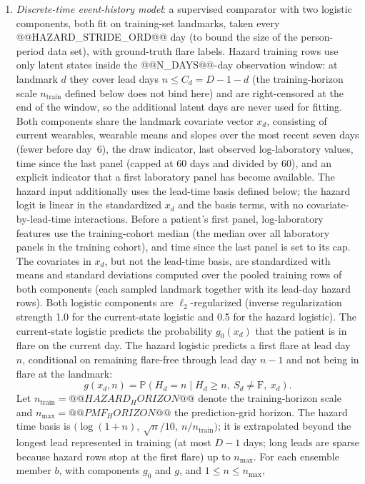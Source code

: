 \documentclass{ieeeaccess}
\newcommand{\F}{\mathrm{F}}
\newcommand{\Prb}{\mathbb P}
\begin{document}
\begin{enumerate}
\item \emph{Discrete-time event-history model}: a supervised comparator with two logistic components, both fit on training-set landmarks, taken every @@HAZARD_STRIDE_ORD@@ day (to bound the size of the person-period data set), with ground-truth flare labels. Hazard training rows use only latent states inside the @@N_DAYS@@-day observation window: at landmark $d$ they cover lead days $n\le C_d=D-1-d$ (the training-horizon scale $n_{\mathrm{train}}$ defined below does not bind here) and are right-censored at the end of the window, so the additional latent days are never used for fitting. Both components share the landmark covariate vector $x_d$, consisting of current wearables, wearable means and slopes over the most recent seven days (fewer before day~6), the draw indicator, last observed log-laboratory values, time since the last panel (capped at 60 days and divided by 60), and an explicit indicator that a first laboratory panel has become available. The hazard input additionally uses the lead-time basis defined below; the hazard logit is linear in the standardized $x_d$ and the basis terms, with no covariate-by-lead-time interactions. Before a patient's first panel, log-laboratory features use the training-cohort median (the median over all laboratory panels in the training cohort), and time since the last panel is set to its cap. The covariates in $x_d$, but not the lead-time basis, are standardized with means and standard deviations computed over the pooled training rows of both components (each sampled landmark together with its lead-day hazard rows). Both logistic components are $\ell_2$-regularized (inverse regularization strength 1.0 for the current-state logistic and 0.5 for the hazard logistic). The current-state logistic predicts the probability $g_0(x_d)$ that the patient is in flare on the current day. The hazard logistic predicts a first flare at lead day $n$, conditional on remaining flare-free through lead day $n-1$ and not being in flare at the landmark:
\[
g(x_d, n) = \Prb(H_d = n \mid H_d \ge n,\ S_d \neq \F,\ x_d).
\]
Let $n_{\mathrm{train}} = @@HAZARD_HORIZON@@$ denote the training-horizon scale and $n_{\max} = @@PMF_HORIZON@@$ the prediction-grid horizon. The hazard time basis is $\bigl(\log(1+n),\ \sqrt{n}/10,\ n/n_{\mathrm{train}}\bigr)$; it is extrapolated beyond the longest lead represented in training (at most $D-1$ days; long leads are sparse because hazard rows stop at the first flare) up to $n_{\max}$. For each ensemble member $b$, with components $g_0$ and $g$, and $1 \le n \le n_{\max}$,

\end{enumerate}
\end{document}
